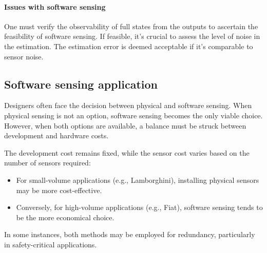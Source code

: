 \paragraph*{Issues with software sensing}
One must verify the observability of full states from the outputs to ascertain the feasibility of software sensing. 
If feasible, it's crucial to assess the level of noise in the estimation. 
The estimation error is deemed acceptable if it's comparable to sensor noise.

\subsection{Software sensing application}
Designers often face the decision between physical and software sensing. 
When physical sensing is not an option, software sensing becomes the only viable choice. 
However, when both options are available, a balance must be struck between development and hardware costs.

The development cost remains fixed, while the sensor cost varies based on the number of sensors required:
\begin{itemize}
    \item For small-volume applications (e.g., Lamborghini), installing physical sensors may be more cost-effective.
    \item Conversely, for high-volume applications (e.g., Fiat), software sensing tends to be the more economical choice.
\end{itemize}
In some instances, both methods may be employed for redundancy, particularly in safety-critical applications.